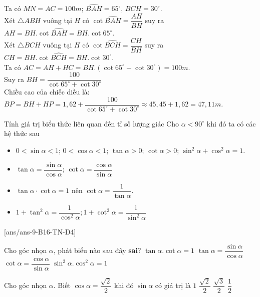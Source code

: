 \begin{ex}
{Ta có $MN=AC=100m$; $\widehat{BAH}=65^\circ$, $\widehat{BCH}=30^\circ$.\\
Xét $\triangle ABH$ vuông tại $H$ có $\cot \widehat{BAH}=\dfrac{AH}{BH}$ suy ra $AH=BH.\cot \widehat{BAH}=BH.\cot{65^\circ}$.\\
Xét $\triangle BCH$ vuông tại $H$ có $\cot \widehat{BCH}=\dfrac{CH}{BH}$ suy ra $CH=BH.\cot \widehat{BCH}=BH.\cot{30^\circ}$.\\
Ta có $AC=AH+HC=BH.\left(\cot{65^\circ}+\cot{30^\circ}\right)=100m$.\\
Suy ra $BH=\dfrac{100}{\cot{65^\circ}+\cot{30^\circ}}$\\
Chiều cao của chiếc diều là: $BP=BH+HP=1,62+\dfrac{100}{\cot{65^\circ}+\cot{30^\circ}}\approx 45,45+1,62=47,11m$.}
\end{ex}
\begin{dang}{Tính giá trị biểu thức liên quan đến tỉ số lượng giác}
	Cho $\alpha<90^\circ$ khi đó ta có các hệ thức sau
	\begin{itemize}
	\item $0<\sin \alpha<1$; $0<\cos \alpha<1$; $\tan \alpha>0$; $\cot \alpha>0$; $\sin ^2 \alpha+\cos ^2 \alpha=1 .$
	\item $\tan \alpha=\dfrac{\sin \alpha}{\cos \alpha}$; $\cot \alpha=\dfrac{\cos \alpha}{\sin \alpha}$
	\item $\tan \alpha \cdot \cot \alpha=1 \text { nên } \cot \alpha=\dfrac{1}{\tan \alpha} . $
	\item $1+\tan ^2 \alpha=\dfrac{1}{\cos ^2 \alpha} ; 1+\cot ^2 \alpha=\dfrac{1}{\sin ^2 \alpha}$
	\end{itemize}
\end{dang}
[ans/ans-9-B16-TN-D4]
\begin{ex}%
%
Cho góc nhọn $\alpha$, phát biểu nào sau đây \textbf{sai}?
\choice
{$\tan \alpha.\cot \alpha=1$}
{$\tan \alpha=\dfrac{\sin \alpha}{\cos \alpha}$}
{$\cot \alpha=\dfrac{\cos \alpha}{\sin \alpha}$}
{\True $\sin^2\alpha.\cos^2\alpha=1$}
\loigiai{
}
\end{ex}
\begin{ex}%
	Cho góc nhọn $\alpha$. Biết $\cos \alpha=\dfrac{\sqrt{2}}{2}$ khi đó $\sin \alpha$ có giá trị là
	\choice
	{$1$}
	{\True $\dfrac{\sqrt{2}}{2}$}
	{$\dfrac{\sqrt{3}}{2}$}
	{$\dfrac{1}{2}$}
\end{ex}
